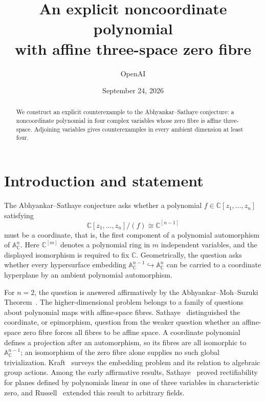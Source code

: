 \documentclass[11pt]{article}
\title{An explicit noncoordinate polynomial\\with affine three-space zero fibre}
\author{OpenAI}
\date{September 24, 2026}
\numberwithin{equation}{section}
\newcommand{\CC}{\mathbb C}
\newcommand{\Aff}{\mathbb A}
\begin{document}
\maketitle

\begin{abstract}
We construct an explicit counterexample to the Abhyankar--Sathaye conjecture:
a noncoordinate polynomial in four complex variables whose zero fibre is affine
three-space. Adjoining variables gives counterexamples in every ambient
dimension at least four.
\end{abstract}

\section{Introduction and statement}\label{sec:introduction}

The Abhyankar--Sathaye conjecture asks whether a polynomial
$f\in\CC[z_1,\ldots,z_n]$ satisfying
\[
  \CC[z_1,\ldots,z_n]/(f)\cong\CC^{[n-1]}
\]
must be a coordinate, that is, the first component of a polynomial automorphism
of $\Aff^n_{\CC}$.
Here $\CC^{[m]}$ denotes a polynomial ring in $m$ independent variables, and
the displayed isomorphism is required to fix $\CC$.
Geometrically, the question asks whether
every hypersurface embedding $\Aff^{n-1}_{\CC}\hookrightarrow\Aff^n_{\CC}$ can
be carried to a coordinate hyperplane by an ambient polynomial automorphism.

For $n=2$, the question is answered affirmatively by the
Abhyankar--Moh--Suzuki Theorem~\cite{AM,Suzuki}.
The higher-dimensional problem belongs to a family of questions about
polynomial maps with affine-space fibres. Sathaye~\cite[pp.~1--2]{Sathaye}
distinguished the coordinate, or epimorphism, question from the weaker question
whether an affine-space zero fibre forces all fibres to be affine space.
A coordinate polynomial defines a projection after an automorphism, so its
fibres are all isomorphic to $\Aff^{n-1}_{\CC}$; an isomorphism of the zero fibre
alone supplies no such global trivialization.
Kraft~\cite[\S4]{Kraft} surveys the embedding problem and its relation to
algebraic group actions. Among the early affirmative results,
Sathaye~\cite{Sathaye} proved rectifiability for planes defined by
polynomials linear in one of three variables in characteristic zero, and
Russell~\cite[Theorem~2.3]{Russell} extended this result to arbitrary fields.
\end{document}
